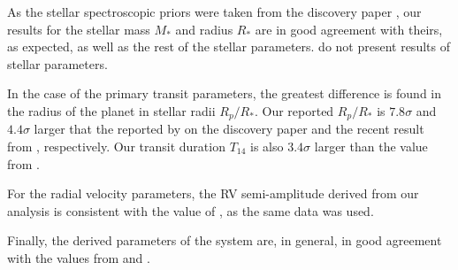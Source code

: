 As the stellar spectroscopic priors were taken from the discovery paper \cite{Hellier2009}, our results for the stellar mass $M_*$ and radius $R_*$ are in good agreement with theirs, as expected, as well as the rest of the stellar parameters. \cite{Shporer2018} do not present results of stellar parameters.

In the case of the primary transit parameters, the greatest difference is found in the radius of the planet in stellar radii $R_{p}/R_{*}$. Our reported $R_{p}/R_{*}$ is $7.8\sigma$ and $4.4\sigma$ larger that the reported by \cite{Hellier2009} on the discovery paper and the recent result from \cite{Shporer2018}, respectively.  Our transit duration $T_{14}$ is also $3.4\sigma$ larger than the value from \cite{Hellier2009}.

For the radial velocity parameters, the RV semi-amplitude derived from our analysis is consistent with the value of \cite{Hellier2009}, as the same data was used. 

Finally, the derived parameters of the system are, in general, in good agreement with the values from \cite{Hellier2009} and \cite{Shporer2018}. 



